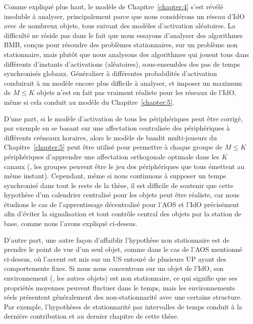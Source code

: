 \begin{resume_fr}
Comme expliqué plus haut, le modèle de Chapitre~\ref{chapter:4} s'est révélé insoluble à analyser, principalement parce que nous considérons un réseau d'IdO avec de nombreux objets, tous suivant des modèles d'activation aléatoires.
La difficulté ne réside pas dans le fait que nous essayons d'analyser des algorithmes BMB, conçus pour résoudre des problèmes stationnaires, sur un problème non stationnaire,
mais plutôt que nous analysons des algorithmes qui jouent tous dans différents d'instants d'activations (aléatoires), sous-ensembles des pas de temps synchronisés globaux.
Généraliser à différentes probabilités d'activation conduirait à un modèle encore plus difficile à analyser, et imposer un maximum de $M \leq K$ objets n'est en fait pas vraiment réaliste pour les réseaux de l'IdO, même si cela conduit au modèle du Chapitre~\ref{chapter:5}.

D'une part, si le modèle d'activation de tous les périphériques peut être corrigé, par exemple en se basant sur une affectation centralisée des périphériques à différents créneaux horaires, alors le modèle de bandit multi-joueurs du Chapitre~\ref{chapter:5} peut être utilisé pour permettre à chaque groupe de $M \leq K$ périphériques d'apprendre une affectation orthogonale optimale dans les $K$ canaux (\eg, les groupes peuvent être le jeu des périphériques que tous émettent au même instant).
%
Cependant, même si nous continuons à supposer un temps synchronisé dans tout le reste de la thèse,
il est difficile de soutenir que cette hypothèse d'un calendrier centralisé pour les objets peut être réaliste, car nous étudions le cas de l'apprentissage décentralisé pour l'AOS et l'IdO précisément afin d'éviter la signalisation et tout contrôle central des objets par la station de base, comme nous l'avons expliqué ci-dessus.

D'autre part, une autre façon d'affaiblir l'hypothèse non stationnaire est de prendre le point de vue d'un seul objet, comme dans le cas de l'AOS mentionné ci-dessus, où l'accent est mis sur un US entouré de plusieurs UP ayant des comportements fixes.
Si nous nous concentrons sur un objet de l'IdO, son environnement (\ie, les autres objets) est non stationnaire, ce qui signifie que ses propriétés moyennes peuvent fluctuer dans le temps, mais les environnements réels présentent généralement des non-stationnarité avec une certaine structure.
Par exemple, l'hypothèses de stationnarité par intervalles de temps conduit à la dernière contribution et au dernier chapitre de cette thèse.



\end{resume_fr}
